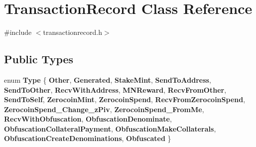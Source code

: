 \hypertarget{class_transaction_record}{}\section{Transaction\+Record Class Reference}
\label{class_transaction_record}


{\ttfamily \#include $<$transactionrecord.\+h$>$}

\subsection*{Public Types}
\begin{DoxyCompactItemize}
\item 
\mbox{\label{class_transaction_record_afb76f5876fba21c3d2c388b98a35d685}} 
enum {\bfseries Type} \{ \newline
{\bfseries Other}, 
{\bfseries Generated}, 
{\bfseries Stake\+Mint}, 
{\bfseries Send\+To\+Address}, 
\newline
{\bfseries Send\+To\+Other}, 
{\bfseries Recv\+With\+Address}, 
{\bfseries M\+N\+Reward}, 
{\bfseries Recv\+From\+Other}, 
\newline
{\bfseries Send\+To\+Self}, 
{\bfseries Zerocoin\+Mint}, 
{\bfseries Zerocoin\+Spend}, 
{\bfseries Recv\+From\+Zerocoin\+Spend}, 
\newline
{\bfseries Zerocoin\+Spend\+\_\+\+Change\+\_\+z\+Piv}, 
{\bfseries Zerocoin\+Spend\+\_\+\+From\+Me}, 
{\bfseries Recv\+With\+Obfuscation}, 
{\bfseries Obfuscation\+Denominate}, 
\newline
{\bfseries Obfuscation\+Collateral\+Payment}, 
{\bfseries Obfuscation\+Make\+Collaterals}, 
{\bfseries Obfuscation\+Create\+Denominations}, 
{\bfseries Obfuscated}
 \}
\end{DoxyCompactItemize}
